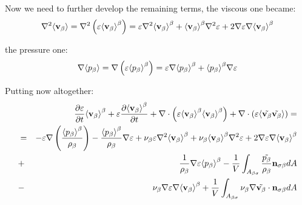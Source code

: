 
Now we need to further develop the remaining terms, the viscous one became:
\begin{equation}
	\nabla^2 \means{\vb} = \nabla^2 \left( \varepsilon \meani{\vb} \right) = \varepsilon \nabla^2 \meani{\vb} + \meani{\vb} \nabla^2 \varepsilon +2 \nabla \varepsilon \nabla \meani{\vb}
\end{equation}

the pressure one:
\begin{equation}
\nabla \means{\pb} = \nabla \left( \varepsilon \meani{\pb} \right) = \varepsilon \nabla \meani{\pb} + \meani{\pb} \nabla \varepsilon
\end{equation}

Putting now altogether:
\begin{eqnarray}
& & \derp{\varepsilon}{t}\meani{\vb} + \varepsilon \derp{\meani{\vb}}{t} + \nabla \cdot \left(\varepsilon \meani{\vb}\meani{\vb}\right)   + \nabla \cdot \left(\varepsilon\means{\tilde{\vb} \tilde{\vb}}\right) = \nonumber \\
&=& -\varepsilon \nabla \left(\dfrac{\meani{\pb}}{\rho_{\beta}}\right) - \dfrac{\meani{\pb}}{\rho_{\beta}} \nabla \varepsilon + \nub \varepsilon \nabla^2 \meani{\vb} + \nub \meani{\vb} \nabla^2 \varepsilon + 2 \nabla \varepsilon \nabla \meani{\vb} \nonumber \\
&+&\dfrac{1}{\rho_{\beta}}\nabla\varepsilon \meani{\pb} - \dfrac{1}{V} \int_{A_{\beta \sigma}} \dfrac{\tilde{\pb}}{\rho_{\beta}} \mathbf{n}_{\sigma \beta} dA \nonumber \\
&-& \nub \nabla \varepsilon \nabla \meani{\vb} + \dfrac{1}{V} \int_{A_{\beta \sigma}} \nub \nabla \tilde{\vb} \cdot \mathbf{n}_{\sigma \beta} dA
\end{eqnarray}

